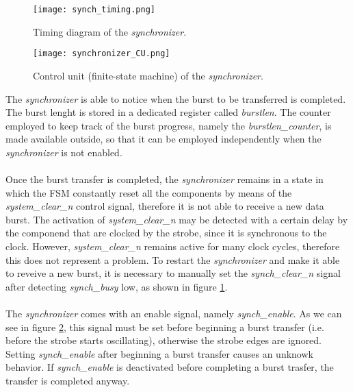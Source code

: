 \documentclass[10pt, english, a4paper, titlepage, oneside]{book}
\begin{document}
\vspace{6mm}
\begin{figure}[H]
    \centering
    \captionsetup{width=10cm}
    \texttt{[image: synch\_timing.png]}
    \caption{\centering Timing diagram of the \textit{synchronizer}.}
    \label{synch_timing}
\end{figure}
\vspace{4mm}
\begin{figure}[H]
    \centering
    \captionsetup{width=14cm}
    \texttt{[image: synchronizer\_CU.png]}
    \vspace{4mm}
    \caption{\centering Control unit (finite-state machine) of the \textit{synchronizer}.}
    \label{synchronizer_CU}
\end{figure}
\vspace{4mm}
\noindent The \textit{synchronizer} is able to notice when the burst to be transferred is completed. The burst lenght is stored in a dedicated register called \textit{burstlen}. The counter employed to keep track of the burst progress, namely the \textit{burstlen\_counter}, is made available outside, so that it can be employed independently when the \textit{synchronizer} is not enabled. \\ \\
Once the burst transfer is completed, the \textit{synchronizer} remains in a state in which the FSM constantly reset all the components by means of the \textit{system\_clear\_n} control signal, therefore it is not able to receive a new data burst. The activation of \textit{system\_clear\_n} may be detected with a certain delay by the componend that are clocked by the strobe, since it is synchronous to the clock. However, \textit{system\_clear\_n} remains active for many clock cycles, therefore this does not represent a problem. To restart the \textit{synchronizer} and make it able to reveive a new burst, it is necessary to manually set the \textit{synch\_clear\_n} signal after detecting \textit{synch\_busy} low, as shown in figure \ref{synch_timing}. \\ \\
The \textit{synchronizer} comes with an enable signal, namely \textit{synch\_enable}. As we can see in figure \ref{synchronizer_CU}, this signal must be set before beginning a burst transfer (i.e. before the strobe starts oscillating), otherwise the strobe edges are ignored. Setting \textit{synch\_enable} after beginning a burst transfer causes an unknowk behavior. If \textit{synch\_enable} is deactivated before completing a burst trasfer, the transfer is completed anyway.
\vspace{6mm}
\end{document}
